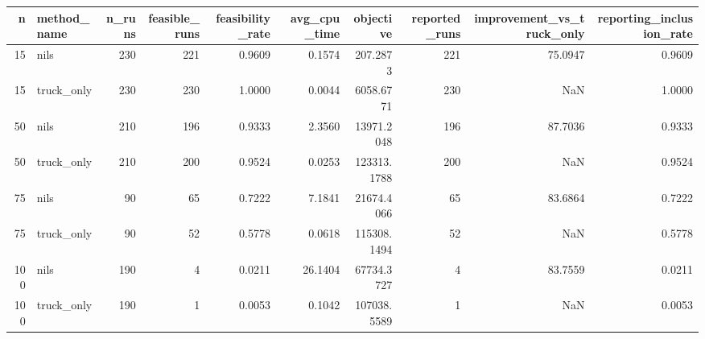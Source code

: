 \begin{tabular}{rlrrrrrrrr}
\toprule
n & method_name & n_runs & feasible_runs & feasibility_rate & avg_cpu_time & objective & reported_runs & improvement_vs_truck_only & reporting_inclusion_rate \\
\midrule
15 & nils & 230 & 221 & 0.9609 & 0.1574 & 207.2873 & 221 & 75.0947 & 0.9609 \\
15 & truck_only & 230 & 230 & 1.0000 & 0.0044 & 6058.6771 & 230 & NaN & 1.0000 \\
50 & nils & 210 & 196 & 0.9333 & 2.3560 & 13971.2048 & 196 & 87.7036 & 0.9333 \\
50 & truck_only & 210 & 200 & 0.9524 & 0.0253 & 123313.1788 & 200 & NaN & 0.9524 \\
75 & nils & 90 & 65 & 0.7222 & 7.1841 & 21674.4066 & 65 & 83.6864 & 0.7222 \\
75 & truck_only & 90 & 52 & 0.5778 & 0.0618 & 115308.1494 & 52 & NaN & 0.5778 \\
100 & nils & 190 & 4 & 0.0211 & 26.1404 & 67734.3727 & 4 & 83.7559 & 0.0211 \\
100 & truck_only & 190 & 1 & 0.0053 & 0.1042 & 107038.5589 & 1 & NaN & 0.0053 \\
\bottomrule
\end{tabular}
